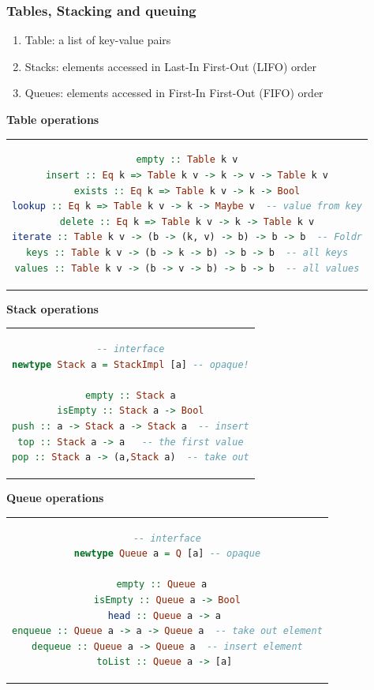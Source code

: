 \subsubsection{Tables, Stacking and queuing}
\begin{enumerate}
\item  Table: a list of key-value pairs
\item  Stacks: elements accessed in Last-In First-Out (LIFO) order
\item  Queues: elements accessed in First-In First-Out (FIFO) order
\end{enumerate}

\textbf{Table operations}
\begin{center}
\begin{tabular}{c}
\begin{lstlisting}[language=Haskell]
empty :: Table k v
insert :: Eq k => Table k v -> k -> v -> Table k v
exists :: Eq k => Table k v -> k -> Bool
lookup :: Eq k => Table k v -> k -> Maybe v  -- value from key
delete :: Eq k => Table k v -> k -> Table k v
iterate :: Table k v -> (b -> (k, v) -> b) -> b -> b  -- Foldr
keys :: Table k v -> (b -> k -> b) -> b -> b  -- all keys
values :: Table k v -> (b -> v -> b) -> b -> b  -- all values
\end{lstlisting}
\end{tabular}
\end{center}
 

\textbf{Stack operations}
\begin{center}
\begin{tabular}{c}
\begin{lstlisting}[language=Haskell]
-- interface
newtype Stack a = StackImpl [a] -- opaque!

empty :: Stack a
isEmpty :: Stack a -> Bool
push :: a -> Stack a -> Stack a  -- insert
top :: Stack a -> a   -- the first value
pop :: Stack a -> (a,Stack a)  -- take out
\end{lstlisting}
\end{tabular}
\end{center}
 

\textbf{Queue operations}
\begin{center}
\begin{tabular}{c}
\begin{lstlisting}[language=Haskell]
-- interface
newtype Queue a = Q [a] -- opaque

empty :: Queue a  
isEmpty :: Queue a -> Bool
head :: Queue a -> a 
enqueue :: Queue a -> a -> Queue a  -- take out element
dequeue :: Queue a -> Queue a  -- insert element
toList :: Queue a -> [a] 
\end{lstlisting}
\end{tabular}
\end{center}
 
